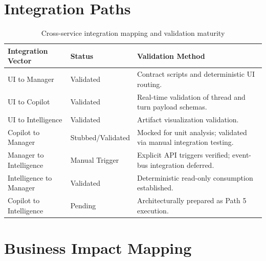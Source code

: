 \section{Integration Paths}
\label{app:integration}

\begin{table}[H]
\centering
\scriptsize
\renewcommand{\arraystretch}{1.3}
\begin{tabularx}{\textwidth}{|p{3.8cm}|p{2.8cm}|>{\RaggedRight\arraybackslash}X|}
\hline
\rowcolor{lightgray}
\textbf{Integration Vector} & \textbf{Status} & \textbf{Validation Method} \\ \hline
UI to Manager & Validated & Contract scripts and deterministic UI routing. \\ \hline
UI to Copilot & Validated & Real-time validation of thread and turn payload schemas. \\ \hline
UI to Intelligence & Validated & Artifact visualization validation. \\ \hline
Copilot to Manager & Stubbed/Validated & Mocked for unit analysis; validated via manual integration testing. \\ \hline
Manager to Intelligence & Manual Trigger & Explicit API triggers verified; event-bus integration deferred. \\ \hline
Intelligence to Manager & Validated & Deterministic read-only consumption established. \\ \hline
Copilot to Intelligence & Pending & Architecturally prepared as Path 5 execution. \\ \hline
\end{tabularx}
\caption{Cross-service integration mapping and validation maturity}
\label{tab:integration}
\end{table}

\section{Business Impact Mapping}
\label{app:business-impact}

